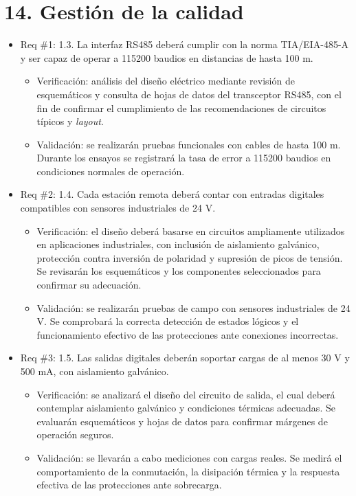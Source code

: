 \documentclass[
11pt, %
]{charter}
\begin{document}
\section{14. Gestión de la calidad}
\label{sec:calidad}

\begin{itemize}
	\item Req \#1: 1.3. La interfaz RS485 deberá cumplir con la norma TIA/EIA-485-A y ser capaz de operar a 115200 baudios en distancias de hasta 100 m.
	\begin{itemize}
		\item Verificación: análisis del diseño eléctrico mediante revisión de esquemáticos y consulta de hojas de datos del transceptor RS485, con el fin de confirmar el cumplimiento de las recomendaciones de circuitos típicos y \textit{layout}.
		\item Validación: se realizarán pruebas funcionales con cables de hasta 100 m. Durante los ensayos se registrará la tasa de error a 115200 baudios en condiciones normales de operación.
	\end{itemize}
	
	\item Req \#2: 1.4. Cada estación remota deberá contar con entradas digitales compatibles con sensores industriales de 24 V.
	\begin{itemize}
		\item Verificación: el diseño deberá basarse en circuitos ampliamente utilizados en aplicaciones industriales, con inclusión de aislamiento galvánico, protección contra inversión de polaridad y supresión de picos de tensión. Se revisarán los esquemáticos y los componentes seleccionados para confirmar su adecuación.
		\item Validación: se realizarán pruebas de campo con sensores industriales de 24 V. Se comprobará la correcta detección de estados lógicos y el funcionamiento efectivo de las protecciones ante conexiones incorrectas.
	\end{itemize}
	
	\item Req \#3: 1.5. Las salidas digitales deberán soportar cargas de al menos 30 V y 500 mA, con aislamiento galvánico.
	\begin{itemize}
		\item Verificación: se analizará el diseño del circuito de salida, el cual deberá contemplar aislamiento galvánico y condiciones térmicas adecuadas. Se evaluarán esquemáticos y hojas de datos para confirmar márgenes de operación seguros.
		\item Validación: se llevarán a cabo mediciones con cargas reales. Se medirá el comportamiento de la conmutación, la disipación térmica y la respuesta efectiva de las protecciones ante sobrecarga.
	\end{itemize}
	

\end{itemize}
\end{document}
